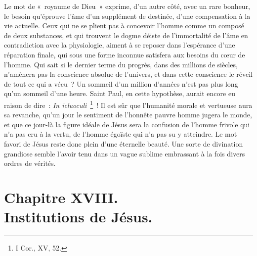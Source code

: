 \documentclass[french,twoside]{book} %
\newcommand\chapteropen{} %
\newcommand\chapterclose{} %
\begin{document}
Le mot de « royaume de Dieu » exprime, d’un autre côté, avec un rare bonheur, le besoin qu’éprouve l’âme d’un supplément de destinée, d’une compensation à la vie actuelle. Ceux qui ne se plient pas à concevoir l’homme comme un composé de deux substances, et qui trouvent le dogme déiste de l’immortalité de l’âme en contradiction avec la physiologie, aiment à se reposer dans l’espérance d’une réparation finale, qui sous une forme inconnue satisfera aux besoins du cœur de l’homme. Qui sait si le dernier terme du progrès, dans des millions de siècles, n’amènera pas la conscience absolue de l’univers, et dans cette conscience le réveil de tout ce qui a vécu ? Un sommeil d’un million d’années n’est pas plus long qu’un sommeil d’une heure. Saint Paul, en cette hypothèse, aurait encore eu raison de dire : {\itshape In icluoculi} \footnote{I Cor., XV, 52.} ! Il est sûr que l’humanité morale et vertueuse aura sa revanche, qu’un jour le sentiment de l’honnête pauvre homme jugera le monde, et que ce jour-là la figure idéale de Jésus sera la confusion de l’homme frivole qui n’a pas cru à la vertu, de l’homme égoïste qui n’a pas su y atteindre. Le mot favori de Jésus reste donc plein d’une éternelle beauté. Une sorte de divination grandiose semble l’avoir tenu dans un vague sublime embrassant à la fois divers ordres de vérités.
\chapterclose


\chapteropen
\chapter[{Chapitre XVIII. Institutions de Jésus.}]{Chapitre XVIII.\\
Institutions de Jésus.}\renewcommand{\leftmark}{Chapitre XVIII.\\
Institutions de Jésus.}
\end{document}
